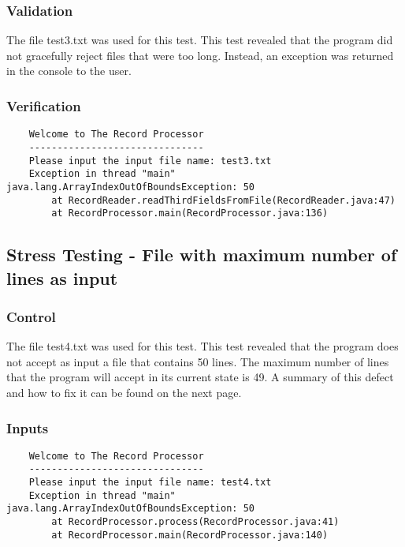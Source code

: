 \documentclass[]{article}
\begin{document}
	\subsubsection{Validation}
	The file test3.txt was used for this test.  This test revealed that the program
	did not gracefully reject files that were too long.  Instead, an exception was
	returned in the console to the user.
	
	\subsubsection{Verification}
	\begin{lstlisting}
	Welcome to The Record Processor
	-------------------------------
	Please input the input file name: test3.txt
	Exception in thread "main" java.lang.ArrayIndexOutOfBoundsException: 50
		at RecordReader.readThirdFieldsFromFile(RecordReader.java:47)
		at RecordProcessor.main(RecordProcessor.java:136)
	\end{lstlisting}
	
	\newpage
	

\subsection{Stress Testing - File with maximum number of lines as input}
	\subsubsection{Control}
	The file test4.txt was used for this test.  This test revealed that the program
	does not accept as input a file that contains 50 lines.  The maximum number of
	lines that the program will accept in its current state is 49.  A summary of
	this defect and how to fix it can be found on the next page.
	
	\subsubsection{Inputs}
	\begin{lstlisting}
	Welcome to The Record Processor
	-------------------------------
	Please input the input file name: test4.txt
	Exception in thread "main" java.lang.ArrayIndexOutOfBoundsException: 50
		at RecordProcessor.process(RecordProcessor.java:41)
		at RecordProcessor.main(RecordProcessor.java:140)
	\end{lstlisting}
	
\end{document}
